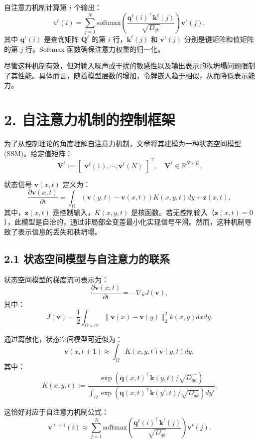 \documentclass[lang=cn,a4paper,newtx]{elegantpaper}
\begin{document}
自注意力机制计算第 $i$ 个输出：
\[
u^\ell(i) = \sum_{j=1}^N \text{softmax}\left( 
\frac{\mathbf{q}^\ell(i)^\top \mathbf{k}^\ell(j)}{\sqrt{D_{qk}}}
\right) \mathbf{v}^\ell(j),
\]
其中 $\mathbf{q}^\ell(i)$ 是查询矩阵 $\mathbf{Q}^\ell$ 的第 $i$ 行，$\mathbf{k}^\ell(j)$ 和 $\mathbf{v}^\ell(j)$ 分别是键矩阵和值矩阵的第 $j$ 行。Softmax 函数确保注意力权重的归一化。

尽管这种机制有效，但对输入噪声或干扰的敏感性以及输出表示的秩坍塌问题限制了其性能。具体而言，随着模型层数的增加，令牌嵌入趋于相似，从而降低表示能力。

\section*{2. 自注意力机制的控制框架}

为了从控制理论的角度理解自注意力机制，文章将其建模为一种状态空间模型 (SSM)。给定值矩阵：
\[
\mathbf{V}^\ell := \begin{bmatrix}
\mathbf{v}^\ell(1), \cdots, \mathbf{v}^\ell(N)
\end{bmatrix}^\top, \quad \mathbf{V}^\ell \in \mathbb{R}^{N \times D}.
\]

状态信号 $\mathbf{v}(x, t)$ 定义为：
\[
\frac{\partial \mathbf{v}(x, t)}{\partial t} = \int_\Omega (\mathbf{v}(y, t) - \mathbf{v}(x, t)) K(x, y, t) dy + \mathbf{z}(x, t),
\]
其中，$\mathbf{z}(x, t)$ 是控制输入，$K(x, y, t)$ 是核函数。若无控制输入（$\mathbf{z}(x, t) = 0$），此模型是自治的，通过非局部全变差最小化实现信号平滑。然而，这种机制导致了表示信息的丢失和秩坍塌。

\subsection*{2.1 状态空间模型与自注意力的联系}

状态空间模型的梯度流可表示为：
\[
\frac{\partial \mathbf{v}(x, t)}{\partial t} = -\nabla_{\mathbf{v}} J(\mathbf{v}),
\]
其中：
\[
J(\mathbf{v}) = \frac{1}{2} \int_{\Omega \times \Omega} \|\mathbf{v}(x) - \mathbf{v}(y)\|_2^2 k(x, y) dx dy.
\]

通过离散化，状态空间模型可近似为：
\[
\mathbf{v}(x, t+1) \approx \int_\Omega K(x, y, t) \mathbf{v}(y, t) dy,
\]
其中：
\[
K(x, y, t) := \frac{\exp(\mathbf{q}(x, t)^\top \mathbf{k}(y, t) / \sqrt{D_{qk}})}
{\int_\Omega \exp(\mathbf{q}(x, t)^\top \mathbf{k}(y', t) / \sqrt{D_{qk}}) dy'}.
\]

这恰好对应于自注意力机制公式：
\[
\mathbf{v}^{\ell+1}(i) \approx \sum_{j=1}^N 
\text{softmax}\left( \frac{\mathbf{q}^\ell(i)^\top \mathbf{k}^\ell(j)}{\sqrt{D_{qk}}} \right) \mathbf{v}^\ell(j).
\]
\end{document}

